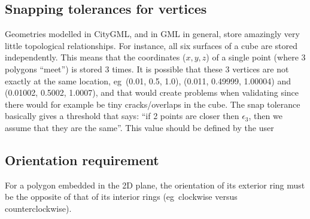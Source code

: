 \documentclass[a4paper,parskip=half,11pt]{scrartcl}
\newcommand{\eg}{eg}
\begin{document}
\subsection{Snapping tolerances for vertices}
Geometries modelled in CityGML, and in GML in general, store amazingly very little topological relationships. 
For instance, all six surfaces of a cube are stored independently. 
This means that the coordinates ($x,y,z$) of a single point (where 3 polygons ``meet'') is stored 3 times. 
It is possible that these 3 vertices are not exactly at the same location, \eg\ (0.01, 0.5, 1.0), (0.011, 0.49999, 1.00004) and (0.01002, 0.5002, 1.0007), and that would create problems when validating since there would for example be tiny cracks/overlaps in the cube.
The snap tolerance basically gives a threshold that says: ``if 2 points are closer then $\epsilon_3$, then we assume that they are the same''.
This value should be defined by the user



\subsection{Orientation requirement}

For a polygon embedded in the 2D plane, the orientation of its exterior ring must be the opposite of that of its interior rings (\eg\ clockwise versus counterclockwise).
\end{document}
